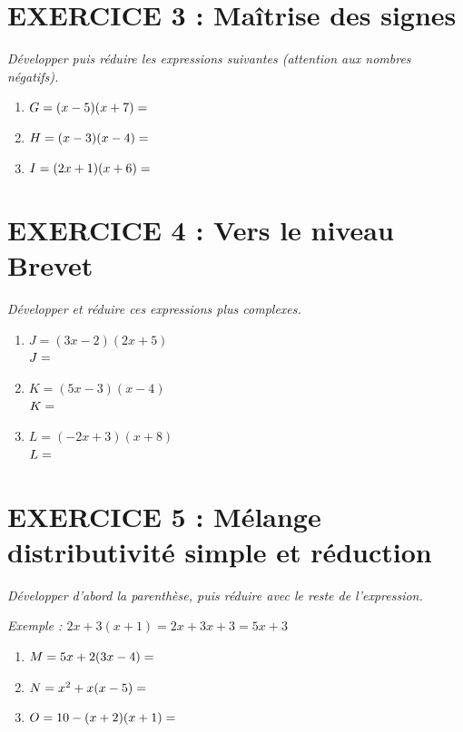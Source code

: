 \documentclass[11pt,a4paper]{article}
\begin{document}
    \section*{EXERCICE 3 : Maîtrise des signes}
    \textit{Développer puis réduire les expressions suivantes (attention aux nombres négatifs).}
    
    \begin{enumerate}
        \item $G = (x - 5)(x + 7) = \dotfill$
        \item $H = (x - 3)(x - 4) = \dotfill$
        \item $I = (2x + 1)(x + 6) = \dotfill$
    \end{enumerate}
    
    \newpage
    
    \section*{EXERCICE 4 : Vers le niveau Brevet}
    \textit{Développer et réduire ces expressions plus complexes.}
    
    \begin{enumerate}
        \item $J = (3x - 2)(2x + 5)$ \\
        $J = \dotfill$
        
        \item $K = (5x - 3)(x - 4)$ \\
        $K = \dotfill$
        
        \item $L = (-2x + 3)(x + 8)$ \\
        $L = \dotfill$
    \end{enumerate}
    
    \section*{EXERCICE 5 : Mélange distributivité simple et réduction}
    \textit{Développer d'abord la parenthèse, puis réduire avec le reste de l'expression.}
    
    \textit{Exemple : $2x + 3(x+1) = 2x + 3x + 3 = 5x + 3$}
    
    \begin{enumerate}
        \item $M = 5x + 2(3x - 4) = \dotfill$
        \item $N = x^2 + x(x - 5) = \dotfill$
        \item $O = 10 - (x + 2)(x + 1) = \dotfill$
    \end{enumerate}
    
\end{document}
